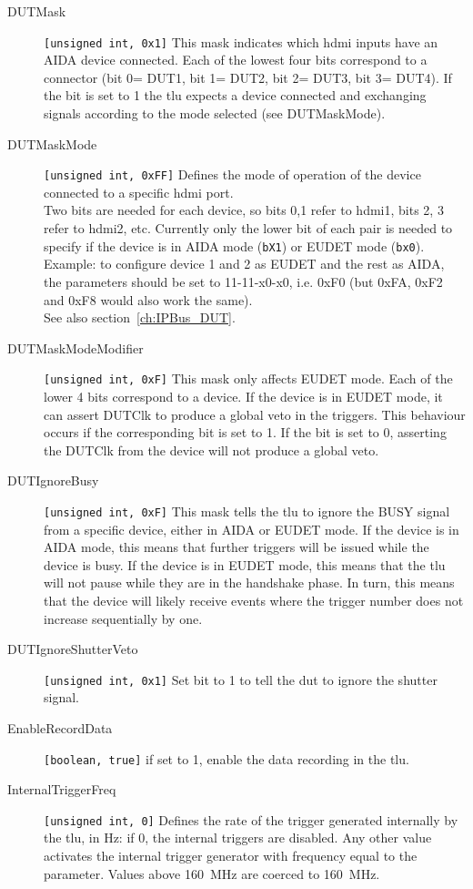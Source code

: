 \begin{description}
  \item[DUTMask]  \verb|[unsigned int, 0x1]| This mask indicates which \gls{hdmi} inputs have an AIDA device connected. Each of the lowest four bits correspond to a connector (bit 0= DUT1, bit 1= DUT2, bit 2= DUT3, bit 3= DUT4). If the bit is set to 1 the \gls{tlu} expects a device connected and exchanging signals according to the mode selected (see DUTMaskMode).
  \item[DUTMaskMode]  \verb|[unsigned int, 0xFF]| Defines the mode of operation of the device connected to a specific \gls{hdmi} port.\\
        Two bits are needed for each device, so bits 0,1 refer to \gls{hdmi}1, bits 2, 3 refer to \gls{hdmi}2, etc. Currently only the lower bit of each pair is needed to specify if the device is in AIDA mode (\texttt{bX1}) or EUDET mode (\texttt{bx0}).\\
        Example: to configure device 1 and 2 as EUDET and the rest as AIDA, the parameters should be set to 11-11-x0-x0, i.e. 0xF0 (but 0xFA, 0xF2 and 0xF8 would also work the same).\\
        See also section~\ref{ch:IPBus_DUT}.
  \item[DUTMaskModeModifier] \verb|[unsigned int, 0xF]| This mask only affects EUDET mode. Each of the lower 4 bits correspond to a device. If the device is in EUDET mode, it can assert DUTClk to produce a global veto in the triggers. This behaviour occurs if the corresponding bit is set to 1. If the bit is set to 0, asserting the DUTClk from the device will not produce a global veto.
  \item[DUTIgnoreBusy] \verb|[unsigned int, 0xF]| This mask tells the \gls{tlu} to ignore the BUSY signal from a specific device, either in AIDA or EUDET mode. If the device is in AIDA mode, this means that further triggers will be issued while the device is busy. If the device is in EUDET mode, this means that the \gls{tlu} will not pause while they are in the handshake phase. In turn, this means that the device will likely receive events where the trigger number does not increase sequentially by one.
  \item[DUTIgnoreShutterVeto] \verb|[unsigned int, 0x1]| Set bit to 1 to tell the \gls{dut} to ignore the shutter signal.
  \item[EnableRecordData] \verb|[boolean, true]| if set to 1, enable the data recording in the \gls{tlu}.
  \item[InternalTriggerFreq] \verb|[unsigned int, 0]| Defines the rate of the trigger generated internally by the \gls{tlu}, in Hz: if 0, the internal triggers are disabled. Any other value activates the internal trigger generator with frequency equal to the parameter. Values above 160~MHz are coerced to 160~MHz.
\end{description} 